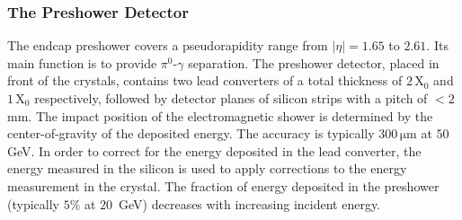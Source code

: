 \subsubsection{The Preshower Detector} 
The endcap preshower covers a pseudorapidity range from $|\eta| = 1.65$ to $2.61$.  Its main function is to provide $\pi^{0}$-$\gamma$ separation. The preshower detector, placed in front of the crystals, contains two lead converters of a total thickness of $2 \,$X$_0$ and $1 \,$X$_0$ respectively, followed by detector planes of silicon strips with a pitch of $< 2 \,$mm. The impact position of the electromagnetic shower is determined by the center-of-gravity of the deposited energy. The accuracy is typically $300 \,\mathrm{\mu m}$ at $50 \,$ GeV. In order to correct for the energy deposited in the lead converter, the energy measured in the silicon is used to apply corrections to the energy measurement in the crystal. The fraction of energy deposited in the preshower (typically $5\%$ at $20 \,$ GeV) decreases with increasing incident energy.

